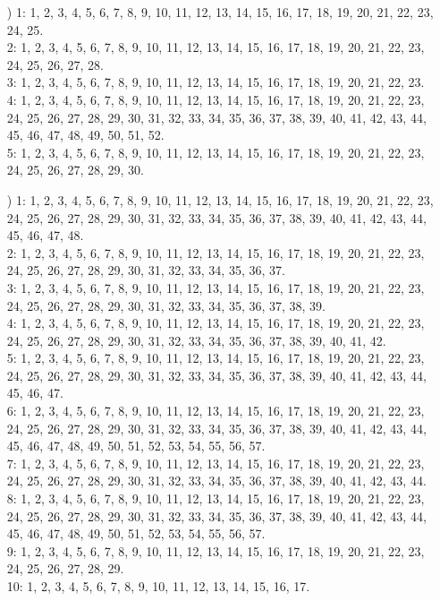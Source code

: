 \documentclass[a4paper,11pt]{article}
\numberwithin{equation}{section}
\begin{document}
\begin{itemize}
\item[\romannumeral2)] 1: 1, 2, 3, 4, 5, 6, 7, 8, 9, 10, 11, 12, 13, 14, 15,
  16, 17, 18, 19, 20, 21, 22, 23, 24, 25. \\
  2: 1, 2, 3, 4, 5, 6, 7, 8, 9, 10, 11, 12, 13, 14, 15, 16, 17, 18, 19, 20,
  21, 22, 23, 24, 25, 26, 27, 28. \\
  3: 1, 2, 3, 4, 5, 6, 7, 8, 9, 10, 11, 12, 13, 14, 15, 16, 17, 18, 19, 20,
  21, 22, 23. \\
  4: 1, 2, 3, 4, 5, 6, 7, 8, 9, 10, 11, 12, 13, 14, 15, 16, 17, 18, 19, 20,
  21, 22, 23, 24, 25, 26, 27, 28, 29, 30, 31, 32, 33, 34, 35, 36, 37, 38,
  39, 40, 41, 42, 43, 44, 45, 46, 47, 48, 49, 50, 51, 52. \\
  5: 1, 2, 3, 4, 5, 6, 7, 8, 9, 10, 11, 12, 13, 14, 15, 16, 17, 18, 19, 20,
  21, 22, 23, 24, 25, 26, 27, 28, 29, 30.

\item[\romannumeral3)] 1: 1, 2, 3, 4, 5, 6, 7, 8, 9, 10, 11, 12, 13, 14, 15,
  16, 17, 18, 19, 20, 21, 22, 23, 24, 25, 26, 27, 28, 29, 30, 31, 32, 33,
  34, 35, 36, 37, 38, 39, 40, 41, 42, 43, 44, 45, 46, 47, 48. \\
  2:  1, 2, 3, 4, 5, 6, 7, 8, 9, 10, 11, 12, 13, 14, 15, 16, 17, 18, 19, 20,
  21, 22, 23, 24, 25, 26, 27, 28, 29, 30, 31, 32, 33, 34, 35, 36, 37. \\
  3: 1, 2, 3, 4, 5, 6, 7, 8, 9, 10, 11, 12, 13, 14, 15, 16, 17, 18, 19, 20,
  21, 22, 23, 24, 25, 26, 27, 28, 29, 30, 31, 32, 33, 34, 35, 36, 37, 38,
  39. \\
  4: 1, 2, 3, 4, 5, 6, 7, 8, 9, 10, 11, 12, 13, 14, 15, 16, 17, 18, 19, 20,
  21, 22, 23, 24, 25, 26, 27, 28, 29, 30, 31, 32, 33, 34, 35, 36, 37, 38,
  39, 40, 41, 42. \\
  5: 1, 2, 3, 4, 5, 6, 7, 8, 9, 10, 11, 12, 13, 14, 15, 16, 17, 18, 19, 20,
  21, 22, 23, 24, 25, 26, 27, 28, 29, 30, 31, 32, 33, 34, 35, 36, 37, 38,
  39, 40, 41, 42, 43, 44, 45, 46, 47. \\
  6: 1, 2, 3, 4, 5, 6, 7, 8, 9, 10, 11, 12, 13, 14, 15, 16, 17, 18, 19, 20,
  21, 22, 23, 24, 25, 26, 27, 28, 29, 30, 31, 32, 33, 34, 35, 36, 37, 38,
  39, 40, 41, 42, 43, 44, 45, 46, 47, 48, 49, 50, 51, 52, 53, 54, 55, 56,
  57. \\
  7: 1, 2, 3, 4, 5, 6, 7, 8, 9, 10, 11, 12, 13, 14, 15, 16, 17, 18, 19, 20,
  21, 22, 23, 24, 25, 26, 27, 28, 29, 30, 31, 32, 33, 34, 35, 36, 37, 38,
  39, 40, 41, 42, 43, 44. \\
  8: 1, 2, 3, 4, 5, 6, 7, 8, 9, 10, 11, 12, 13, 14, 15, 16, 17, 18, 19, 20,
  21, 22, 23, 24, 25, 26, 27, 28, 29, 30, 31, 32, 33, 34, 35, 36, 37, 38,
  39, 40, 41, 42, 43, 44, 45, 46, 47, 48, 49, 50, 51, 52, 53, 54, 55, 56,
  57. \\
  9: 1, 2, 3, 4, 5, 6, 7, 8, 9, 10, 11, 12, 13, 14, 15, 16, 17, 18, 19, 20,
  21, 22, 23, 24, 25, 26, 27, 28, 29. \\
  10: 1, 2, 3, 4, 5, 6, 7, 8, 9, 10, 11, 12, 13, 14, 15, 16, 17.


\end{itemize}
\end{document}
